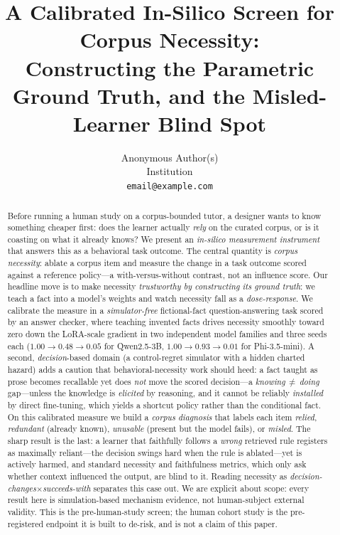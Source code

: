 \documentclass{article}
\title{A Calibrated In-Silico Screen for Corpus Necessity:\\
Constructing the Parametric Ground Truth, and the Misled-Learner Blind Spot}
\author{Anonymous Author(s)\\Institution\\\texttt{email@example.com}}
\begin{document}
\maketitle

\begin{abstract}
Before running a human study on a corpus-bounded tutor, a designer wants to know something cheaper
first: does the learner actually \emph{rely} on the curated corpus, or is it coasting on what it
already knows? We present an \emph{in-silico measurement instrument} that answers this as a
behavioral task outcome. The central quantity is \emph{corpus necessity}: ablate a corpus item and
measure the change in a task outcome scored against a reference policy---a with-versus-without
contrast, not an influence score. Our headline move is to make necessity \emph{trustworthy by
constructing its ground truth}: we teach a fact into a model's weights and watch necessity fall as a
\emph{dose-response}. We calibrate the measure in a \emph{simulator-free} fictional-fact
question-answering task scored by an answer checker, where teaching invented facts drives necessity
smoothly toward zero down the LoRA-scale gradient in two independent model families and three seeds
each ($1.00\!\to\!0.48\!\to\!0.05$ for Qwen2.5-3B, $1.00\!\to\!0.93\!\to\!0.01$ for Phi-3.5-mini).
A second, \emph{decision}-based domain (a control-regret simulator with a hidden charted hazard) adds a
caution that behavioral-necessity work should heed: a fact taught as prose becomes recallable yet does
\emph{not} move the scored decision---a \emph{knowing\,$\neq$\,doing} gap---unless the knowledge is
\emph{elicited} by reasoning, and it cannot be reliably \emph{installed} by direct fine-tuning, which
yields a shortcut policy rather than the conditional fact. On this calibrated
measure we build a \emph{corpus diagnosis} that labels each item \emph{relied}, \emph{redundant}
(already known), \emph{unusable} (present but the model fails), or \emph{misled}. The sharp result is
the last: a learner that faithfully follows a \emph{wrong} retrieved rule registers as maximally
reliant---the decision swings hard when the rule is ablated---yet is actively harmed, and standard
necessity and faithfulness metrics, which only ask whether context influenced the output, are blind
to it. Reading necessity as \emph{decision-changes}$\times$\emph{succeeds-with} separates this case
out. We are explicit about scope: every result here is simulation-based mechanism evidence, not
human-subject external validity. This is the pre-human-study screen; the human cohort study is the
pre-registered endpoint it is built to de-risk, and is not a claim of this paper.
\end{abstract}
\end{document}
